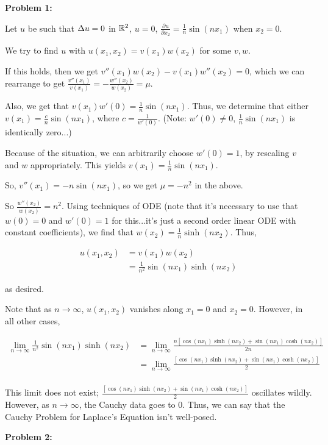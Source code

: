 \documentclass[a4paper,12pt]{article}
\begin{document}
{\bf Problem 1:}

Let $u$ be such that $\Delta u = 0$ in $\mathbb{R}^2$, $u = 0$, $\frac{\partial u}{\partial x_2} = \frac{1}{n} \sin(nx_1)$ when $x_2=0$.

We try to find $u$ with $u(x_1,x_2) = v(x_1)w(x_2)$ for some $v,w$.

If this holds, then we get $v''(x_1)w(x_2) - v(x_1)w''(x_2) = 0$, which we can rearrange to get $\frac{v''(x_1)}{v(x_1)} = - \frac{w''(x_2)}{w(x_2)} = \mu$.

Also, we get that $v(x_1)w'(0) = \frac{1}{n} \sin(nx_1)$. Thus, we determine that either $v(x_1) = \frac{c}{n} \sin(nx_1)$, where $c = \frac{1}{w'(0)}$. (Note: $w'(0) \neq 0$, $\frac{1}{n} \sin(nx_1)$ is identically zero...)

Because of the situation, we can arbitrarily choose $w'(0) = 1$, by rescaling $v$ and $w$ appropriately. This yields $v(x_1) = \frac{1}{n} \sin(nx_1)$.

So, $v''(x_1) = -n \sin(nx_1)$, so we get $\mu = -n^2$ in the above.

So $\frac{w''(x_2)}{w(x_2)} = n^2$. Using techniques of ODE (note that it's necessary to use that $w(0)= 0$ and $w'(0) = 1$ for this...it's just a second order linear ODE with constant coefficients), we find that $w(x_2) = \frac{1}{n}\sinh(nx_2)$. Thus, 

\begin{align*}
u(x_1,x_2) &= v(x_1)w(x_2) \\
&= \frac{1}{n^2} \sin(nx_1)\sinh(nx_2)
\end{align*}

as desired.

Note that as $n \to \infty$, $u(x_1,x_2)$ vanishes along $x_1=0$ and $x_2=0$. However, in all other cases,

\begin{align*}
\lim\limits_{n \to \infty} \frac{1}{n^2} \sin(nx_1)\sinh(nx_2) &= \lim\limits_{n \to \infty} \frac{n\left[\cos(nx_1)\sinh(nx_2) + \sin(nx_1)\cosh(nx_2)\right]}{2n}\\
&= \lim\limits_{n \to \infty} \frac{\left[\cos(nx_1)\sinh(nx_2) + \sin(nx_1)\cosh(nx_2)\right]}{2}\\
\end{align*}

This limit does not exist; $\frac{\left[\cos(nx_1)\sinh(nx_2) + \sin(nx_1)\cosh(nx_2)\right]}{2}$ oscillates wildly. However, as $n \to \infty$, the Cauchy data goes to $0$. Thus, we can say that the Cauchy Problem for Laplace's Equation isn't well-posed.

\shunt

{\bf Problem 2:}

\shunt
\end{document}
